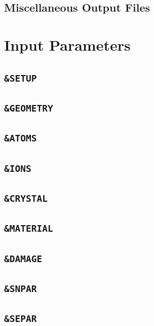 \documentclass[twoside,12pt]{book}
\begin{document}
\section{Miscellaneous Output Files}
\label{s:filesmisc}

%
%
\chapter{Input Parameters}
\label{k:input}

%
\newpage
\section{\texttt{\&SETUP} ~}
\label{s:setup}

%
\newpage
\section{\texttt{\&GEOMETRY} ~}
\label{s:geom}

%
\newpage
\section{\texttt{\&ATOMS} ~}
\label{s:atom}

%
\newpage
\section{\texttt{\&IONS} ~}
\label{s:ion}

%
\newpage
\section{\texttt{\&CRYSTAL} ~}
\label{s:xtal}

%
\newpage
\section{\texttt{\&MATERIAL} ~}
\label{s:target}

%
\newpage
\section{\texttt{\&DAMAGE} ~}
\label{s:damage}

%
\newpage
\section{\texttt{\&SNPAR} ~}
\label{s:snpar}

%
\newpage
\section{\texttt{\&SEPAR} ~}
\label{s:separ}

%
\newpage
\end{document}
